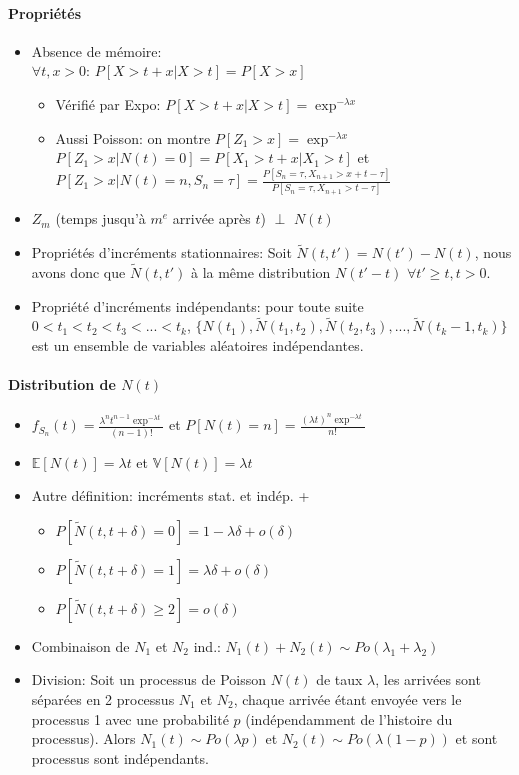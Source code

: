 \documentclass[paper=a4,fontsize=8pt,pagesize,DIV=calc]{scrartcl}
\begin{document}
\begin{multicols}{3}
\paragraph{Propriétés}
\begin{itemize}
\item Absence de mémoire: \\ $\forall t,x>0$: $P[X>t+x|X>t]=P[X>x]$
\begin{itemize}
\item Vérifié par Expo: $P[X>t+x|X>t]=\exp^{-\lambda x}$
\item Aussi Poisson: on montre $P[Z_1>x]=\exp^{-\lambda x}$ \\ $P[Z_1>x|N(t)=0]=P[X_1>t+x|X_1>t]$ et \\ $P[Z_1>x|N(t)=n, S_n=\tau]=\frac{P[S_n=\tau, X_{n+1}>x+t-\tau]}{P[S_n=\tau,X_{n+1}>t-\tau]}$
\end{itemize}
\item $Z_m$ (temps jusqu'à $m^e$ arrivée après $t$) $\perp$ $N(t)$
\item Propriétés d'incréments stationnaires: Soit $\tilde{N} (t, t') = N(t') - N(t)$, nous avons donc que $\tilde{N} (t, t')$ à la même distribution $N(t'- t) $ $\forall t' \geq  t, t > 0$.
\item Propriété d’incréments indépendants: pour toute suite $0 < t_1 < t_2 < t_3 <... < t_k$, $\{N(t_1), \tilde{N}(t_1, t_2), \tilde{N} (t_2, t_3), ... , \tilde{N} (t_k-1, t_k)\}$ est un ensemble
de variables aléatoires indépendantes.
\end{itemize}
\paragraph{Distribution de $N(t)$}
\begin{itemize}
\item $f_{S_n}(t) = \frac{\lambda^n t^{n-1} \exp^{-\lambda t}}{(n-1)!}$ et $P[N(t) = n] = \frac{(\lambda t)^n \exp^{-\lambda t}}{n!}$
\item $\mathbb{E}[N(t)] = \lambda t$ et $\mathbb{V}[N(t)] = \lambda t$
\item Autre définition: incréments stat. et indép. +
\begin{itemize}
\item $P[ \tilde{N} (t, t + \delta) = 0] = 1 - \lambda \delta + o(\delta)$
\item $P[ \tilde{N} (t, t + \delta) = 1] = \lambda \delta + o(\delta)$
\item $P[ \tilde{N} (t, t + \delta) \geq 2] = o(\delta)$
\end{itemize}
\item Combinaison de $N_1$ et $N_2$ ind.: $N_1(t)+N_2(t)\sim Po(\lambda_1+\lambda_2)$
\item Division: Soit un processus de Poisson $N(t)$ de taux $\lambda$, les arrivées sont séparées en 2 processus $N_1$ et $N_2$, chaque arrivée étant envoyée vers le processus 1 avec une probabilité $p$
(indépendamment de l’histoire du processus).
Alors $N_1(t)\sim Po (\lambda p)$ et $N_2(t)\sim Po (\lambda (1-p))$ et sont processus sont indépendants.
\end{itemize}

\end{multicols}
\end{document}
